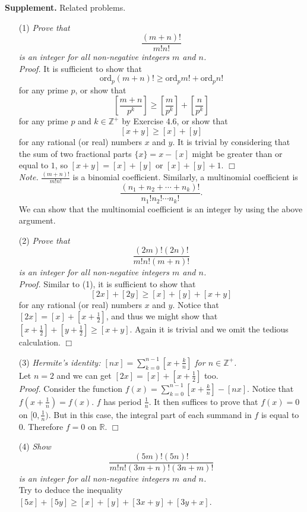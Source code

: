 \documentclass{article}
\begin{document}
\textbf{Supplement.} Related problems.
\begin{enumerate}
\item[(1)]
\emph{Prove that
$$\frac{(m + n)!}{m!n!}$$
is an integer for all non-negative integers $m$ and $n$.} \\

\emph{Proof.}
It is sufficient to show that
$$\text{ord}_p (m + n)! \geq \text{ord}_p m! + \text{ord}_p n!$$
for any prime $p$, or show that
$$\left[\frac{m + n}{p^k}\right]
\geq \left[\frac{m}{p^k}\right] + \left[\frac{n}{p^k}\right]$$
for any prime $p$ and $k \in \mathbb{Z}^+$ by Exercise 4.6, or show that
$$[x + y] \geq [x] + [y]$$
for any rational (or real) numbers $x$ and $y$.
It is trivial by considering that the sum of two fractional parts $\{x\} = x - [x]$
might be greater than or equal to $1$, so $[x + y] = [x] + [y]$ or $[x] + [y] + 1$.
$\Box$ \\

\emph{Note.}
$\frac{(m + n)!}{m!n!}$ is a binomial coefficient.
Similarly, a multinomial coefficient is
$$\frac{(n_1 + n_2 + \cdots + n_k)!}{n_1!n_2! \cdots n_k!}.$$
We can show that the multinomial coefficient is an integer
by using the above argument. \\

\item[(2)]
\emph{Prove that
$$\frac{(2m)!(2n)!}{m!n!(m + n)!}$$
is an integer for all non-negative integers $m$ and $n$.} \\

\emph{Proof.}
Similar to (1), it is sufficient to show that
$$[2x] + [2y] \geq [x] + [y] + [x + y]$$
for any rational (or real) numbers $x$ and $y$.
Notice that $[2x] = [x] + [x + \frac{1}{2}]$, and thus we might show that
$[x + \frac{1}{2}] + [y + \frac{1}{2}] \geq [x + y]$.
Again it is trivial and we omit the tedious calculation.
$\Box$ \\

\item[(3)]
\emph{Hermite's identity:
$[nx] = \sum_{k=0}^{n-1} [x + \frac{k}{n}]$ for $n \in \mathbb{Z}^+$.} \\

Let $n = 2$ and we can get $[2x] = [x] + [x + \frac{1}{2}]$ too. \\

\emph{Proof.}
Consider the function $f(x) = \sum_{k=0}^{n-1} [x + \frac{k}{n}] - [nx]$.
Notice that $f(x + \frac{1}{n}) = f(x)$. $f$ has period $\frac{1}{n}$.
It then suffices to prove that $f(x) = 0$ on $[0, \frac{1}{n})$.
But in this case, the integral part of each summand in $f$ is equal to $0$.
Therefore $f = 0$ on $\mathbb{R}$.
$\Box$ \\

\item[(4)]
\emph{Show
$$\frac{(5m)!(5n)!}{m! n! (3m + n)! (3n + m)!}$$
is an integer for all non-negative integers $m$ and $n$.} \\

Try to deduce the inequality $[5x] + [5y] \geq [x] + [y] + [3x + y] + [3y + x]$.

\end{enumerate}
\end{document}
